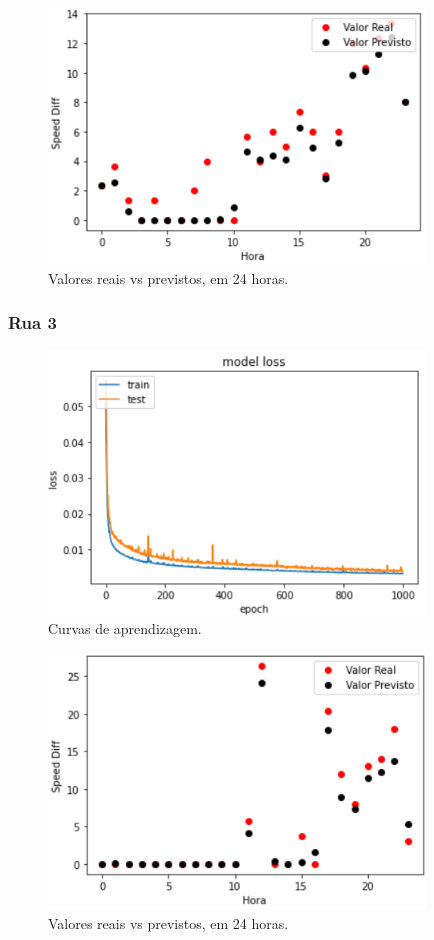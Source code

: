 \documentclass[a4paper, 12pt]{article}
\begin{document}
\begin{figure}[H]
	\centering
	\includegraphics[width=10cm]{resultados/real_prev_2.png}
	\caption{Valores reais vs previstos, em 24 horas.}
\end{figure}

\subsubsection{Rua 3}



\begin{figure}[H]
	\centering
	\includegraphics[width=10cm]{resultados/curvas_aprend_3.png}
	\caption{Curvas de aprendizagem.}
\end{figure}

\begin{figure}[H]
	\centering
	\includegraphics[width=10cm]{resultados/real_prev_3.png}
	\caption{Valores reais vs previstos, em 24 horas.}
\end{figure}
\end{document}
